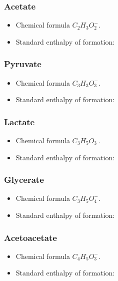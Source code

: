\documentclass{article}
\begin{document}
\subsubsection{Acetate}
\begin{itemize}
    \item Chemical formula $C_2H_3O_2^-$.
    \item Standard enthalpy of formation:
\end{itemize}

\subsubsection{Pyruvate}
\begin{itemize}
    \item Chemical formula $C_3H_3O_3^-$.
    \item Standard enthalpy of formation:
\end{itemize}

\subsubsection{Lactate}
\begin{itemize}
    \item Chemical formula $C_3H_5O_3^-$.
    \item Standard enthalpy of formation:
\end{itemize}

\subsubsection{Glycerate}
\begin{itemize}
    \item Chemical formula $C_3H_5O_4^-$.
    \item Standard enthalpy of formation:
\end{itemize}

\subsubsection{Acetoacetate}
\begin{itemize}
    \item Chemical formula $C_4H_5O_3^-$.
    \item Standard enthalpy of formation:
\end{itemize}
\end{document}
